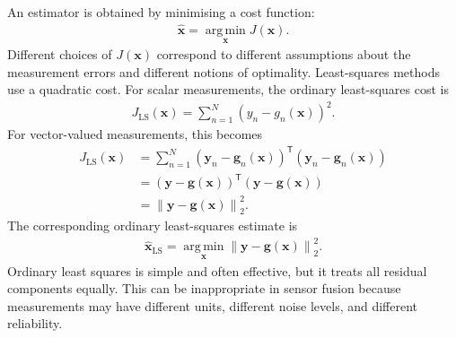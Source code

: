 An estimator is obtained by minimising a cost function:
\begin{align}
\widehat{\mathbf{x}} = \operatorname*{arg\,min}_{\mathbf{x}} J(\mathbf{x}).
\end{align}
Different choices of $J(\mathbf{x})$ correspond to different assumptions about the measurement errors and different notions of optimality. Least-squares methods use a quadratic cost. For scalar measurements, the ordinary least-squares cost is
\begin{align}
J_{\mathrm{LS}}(\mathbf{x}) = \sum_{n=1}^{N}\left(y_n-g_n(\mathbf{x})\right)^2.
\end{align}
For vector-valued measurements, this becomes
\begin{align}
J_{\mathrm{LS}}(\mathbf{x}) &=\sum_{n=1}^{N}\left(\mathbf{y}_n-\mathbf{g}_n(\mathbf{x})\right)^{\mathsf T}\left(\mathbf{y}_n-\mathbf{g}_n(\mathbf{x})\right) \nonumber \\
&= \left( \mathbf{y} - \mathbf{g}(\mathbf{x}) \right)^{\mathsf T}\left(\mathbf{y}-\mathbf{g}(\mathbf{x})\right) \nonumber \\
& = \left\|\mathbf{y} - \mathbf{g}(\mathbf{x}) \right\|_2^2 . %
\end{align}
The corresponding ordinary least-squares estimate is
\begin{align}
\widehat{\mathbf{x}}_{\mathrm{LS}} = \operatorname*{arg\,min}_{\mathbf{x}} \left\| \mathbf{y} - \mathbf{g}(\mathbf{x}) \right\|_2^2.
\end{align}
Ordinary least squares is simple and often effective, but it treats all residual components equally. This can be inappropriate in sensor fusion because measurements may have different units, different noise levels, and different reliability.

